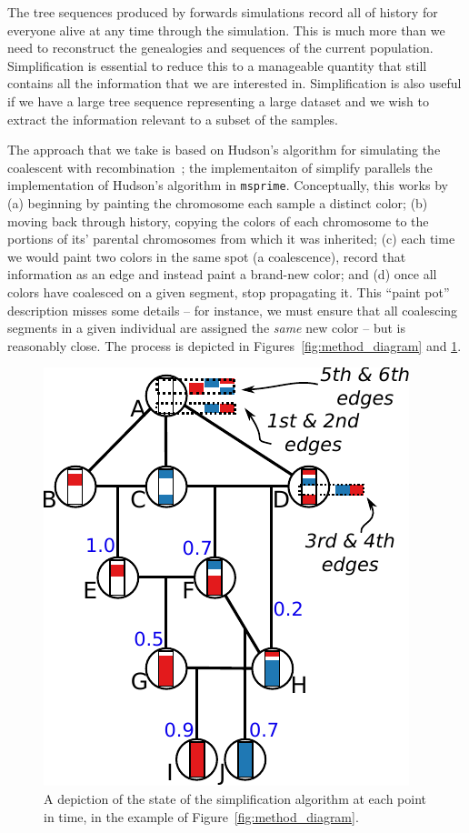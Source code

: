 \documentclass{article}
\newcommand{\msprime}{\texttt{msprime}}
\begin{document}
The tree sequences produced by forwards simulations 
record all of history for everyone alive at any time through the simulation.
This is much more than we need to reconstruct the genealogies and sequences
of the current population.
Simplification is essential to reduce this 
to a manageable quantity that still contains all
the information that we are interested in. 
Simplification is also useful if we have a
large tree sequence representing a large dataset and we wish to extract the
information relevant to a subset of the samples.

The approach that we take is based on Hudson's algorithm for simulating
the coalescent with recombination~\citep{hudson1983properties,kelleher2016efficient};
the implementaiton of simplify parallels the implementation of Hudson's algorithm in \msprime.
Conceptually, this works by 
(a) beginning by painting the chromosome each sample a distinct color;
(b) moving back through history, 
copying the colors of each chromosome to the portions of its' parental chromosomes
from which it was inherited;
(c) each time we would paint two colors in the same spot (a coalescence),
record that information as an edge and instead paint a brand-new color; 
and
(d) once all colors have coalesced on a given segment,
stop propagating it.
This ``paint pot'' description misses some details --
for instance, we must ensure that all coalescing segments in a given individual
are assigned the \emph{same} new color --
but is reasonably close.
The process is depicted in Figures~\ref{fig:method_diagram} and \ref{fig:simplify_state}.

\begin{figure}
    \begin{center}
        \includegraphics{simplify-state-diagram}
    \end{center}
    \caption{
        A depiction of the state of the simplification algorithm
        at each point in time,
        in the example of Figure~\ref{fig:method_diagram}.
        \label{fig:simplify_state}
    }
\end{figure}
\end{document}
